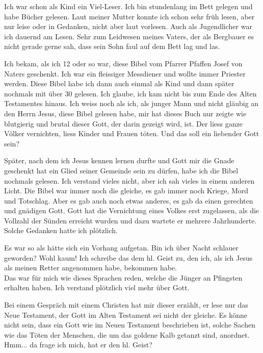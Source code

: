 Ich war schon als Kind ein Viel-Leser. Ich bin stundenlang im Bett gelegen und habe Bücher gelesen. Laut meiner Mutter konnte ich schon sehr früh lesen, aber nur leise oder in Gedanken, nicht aber laut vorlesen. Auch als Jugendlicher war ich dauernd am Lesen. Sehr zum Leidwesen meines Vaters, der als Bergbauer es nicht gerade gerne sah, dass sein Sohn faul auf dem Bett lag und las.

Ich bekam, als ich 12 oder so war, diese Bibel vom Pfarrer Pfaffen Josef von Naters geschenkt. Ich war ein fleissiger Messdiener und wollte immer Priester werden. Diese Bibel habe ich dann auch einmal als Kind und dann später nochmals mit über 30 gelesen. Ich glaube, ich kam nicht bis zum Ende des Alten Testamentes hinaus. Ich weiss noch als ich, als  junger Mann und nicht gläubig an den Herrn Jesus, diese Bibel gelesen habe, mir hat dieses Buch nur zeigte wie blutgierig und brutal dieser Gott, der darin gezeigt wird, ist. Der liess ganze Völker vernichten, liess Kinder und Frauen töten. Und das soll ein liebender Gott sein?

Später, nach dem ich Jesus kennen lernen durfte und Gott mir die Gnade geschenkt hat ein Glied seiner Gemeinde sein zu dürfen, habe ich die Bibel nochmals gelesen. Ich verstand vieles nicht, aber ich sah vieles in einem anderen Licht. Die Bibel war immer noch die gleiche, es gab immer noch Kriege, Mord und Totschlag. Aber es gab auch noch etwas anderes, es gab da einen gerechten und gnädigen Gott. Gott hat die Vernichtung eines Volkes erst zugelassen, als die Vollzahl der Sünden erreicht wurden und dazu wartete er mehrere Jahrhunderte. Solche Gedanken hatte ich plötzlich.

Es war so als hätte sich ein Vorhang aufgetan. Bin ich über Nacht schlauer geworden? Wohl kaum! Ich schreibe das dem hl. Geist zu, den ich, als ich Jesus als meinen Retter angenommen habe, bekommen habe.\\
Das war für mich wie dieses Sprachen reden, welche die Jünger an Pfingsten erhalten haben. Ich verstand plötzlich viel mehr über Gott.

Bei einem Gespräch mit einem Christen hat mir dieser erzählt, er lese nur das Neue Testament, der Gott im Alten Testament sei nicht der gleiche. Es könne nicht sein, dass ein Gott wie im Neuen Testament beschrieben ist, solche Sachen wie das Töten der Menschen, die um das goldene Kalb getanzt sind, anordnet. Hmm... da frage ich mich, hat er den hl. Geist? 

